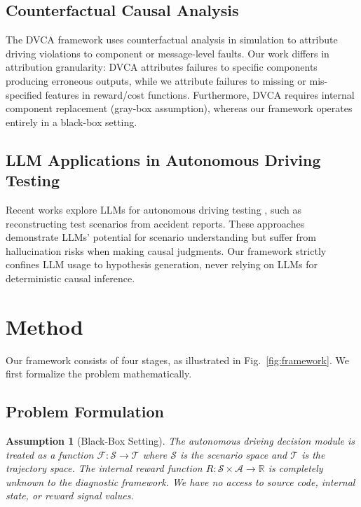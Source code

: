 \documentclass[conference]{IEEEtran}
\theoremstyle{plain}
\newtheorem{assumption}{Assumption}[section]
\begin{document}
\subsection{Counterfactual Causal Analysis}
The DVCA framework \cite{wan2024dvca} uses counterfactual analysis in simulation to attribute driving violations to component or message-level faults. Our work differs in attribution granularity: DVCA attributes failures to specific components producing erroneous outputs, while we attribute failures to missing or mis-specified features in reward/cost functions. Furthermore, DVCA requires internal component replacement (gray-box assumption), whereas our framework operates entirely in a black-box setting.

\subsection{LLM Applications in Autonomous Driving Testing}
Recent works explore LLMs for autonomous driving testing \cite{safe2026}, such as reconstructing test scenarios from accident reports. These approaches demonstrate LLMs' potential for scenario understanding but suffer from hallucination risks when making causal judgments. Our framework strictly confines LLM usage to hypothesis generation, never relying on LLMs for deterministic causal inference.

\section{Method}
\label{sec:method}

Our framework consists of four stages, as illustrated in Fig.\ \ref{fig:framework}. We first formalize the problem mathematically.

\subsection{Problem Formulation}
\label{sec:formulation}

\begin{assumption}[Black-Box Setting]
The autonomous driving decision module is treated as a function $\mathcal{F}: \mathcal{S} \rightarrow \mathcal{T}$ where $\mathcal{S}$ is the scenario space and $\mathcal{T}$ is the trajectory space. The internal reward function $R: \mathcal{S} \times \mathcal{A} \rightarrow \mathbb{R}$ is completely unknown to the diagnostic framework. We have no access to source code, internal state, or reward signal values.
\end{assumption}
\end{document}
